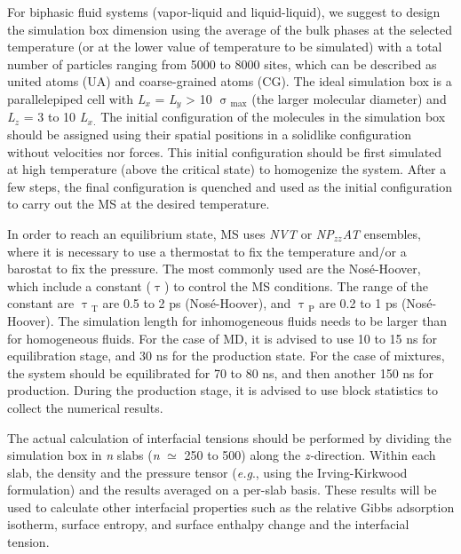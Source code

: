 \documentclass{scrbook}
\begin{document}
For biphasic fluid systems (vapor-liquid and liquid-liquid), we suggest to
design the simulation box dimension using the average of the bulk phases at the
selected temperature (or at the lower value of temperature to be simulated)
with a total number of particles ranging from 5000 to 8000 sites, which can be
described as united atoms (UA) and coarse-grained atoms (CG). The ideal
simulation box is a parallelepiped cell with \textit{L}$_{x}$
= \textit{L}$_{y}$ {\textgreater} 10 ${\upsigma}$$_{\mathrm{max}}$ (the larger
molecular diameter) and \textit{L}$_{z}$ = 3 to 10
\textit{L}$_{x}$$_{\mathrm{.}}$ The initial configuration of the molecules in
the simulation box should be assigned using their spatial positions in
a solidlike configuration without velocities nor forces. This initial
configuration should be first simulated at high temperature (above the critical
state) to homogenize the system. After a few steps, the final configuration is
quenched and used as the initial configuration to carry out the MS at the
desired temperature.

In order to reach an equilibrium state, MS uses \textit{NVT} or
\textit{NP}$_{zz}$\textit{AT} ensembles, where it is necessary to use
a thermostat to fix the temperature and/or a barostat to fix the pressure. The
most commonly used are the Nos\'{e}-Hoover, which include a constant
({${\uptau}$}) to control the MS conditions. The range of the constant are
{${\uptau}$}$_{\mathrm{T}}$ are 0.5 to 2 ps (Nos\'{e}-Hoover), and
{${\uptau}$}$_{\mathrm{P}}$ are 0.2 to 1 ps (Nos\'{e}-Hoover). The simulation
length for inhomogeneous fluids needs to be larger than for homogeneous fluids.
For the case of MD, it is advised to use 10 to 15 ns for equilibration stage,
and 30 ns for the production state. For the case of mixtures, the system should
be equilibrated for 70 to 80 ns, and then another 150 ns for production. During
the production stage, it is advised to use block statistics to collect the
numerical results.

The actual calculation of interfacial tensions should be performed by dividing
the simulation box in \textit{n} slabs (\textit{n} ${\simeq}$ 250 to 500) along
the \textit{z-}direction. Within each slab, the density and the pressure tensor
(\textit{e.g}., using the Irving-Kirkwood formulation) and the results averaged
on a per-slab basis. These results will be used to calculate other interfacial
properties such as the relative Gibbs adsorption isotherm, surface entropy, and
surface enthalpy change and the interfacial tension.
\end{document}
